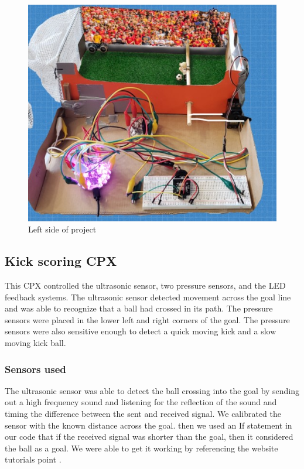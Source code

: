 \documentclass[12pt]{article}
\begin{document}
\begin{figure}[!t]
\centering
\includegraphics[width=4.5in]{project_left.jpg}
\caption{Left side of project}
\label{fig:left}
\end{figure}



\subsection{Kick scoring CPX}

This CPX controlled the ultrasonic sensor, two pressure sensors, and the LED feedback systems. The ultrasonic sensor detected movement across the goal line and was able to recognize that a ball had crossed in its path. The pressure sensors were placed in the lower left and right corners of the goal. The pressure sensors were also sensitive enough to detect a quick moving kick and a slow moving kick ball. 

\subsubsection{Sensors used}

The ultrasonic sensor was able to detect the ball crossing into the goal by sending out a high frequency sound and listening for the reflection of the sound and timing the difference between the sent and received signal. We calibrated the sensor with the known distance across the goal. then we used an If statement in our code that if the received signal was shorter than the goal, then it considered the ball as a goal. We were able to get it working by referencing the website tutorials point \cite{tutorialspoint}. %
\end{document}
